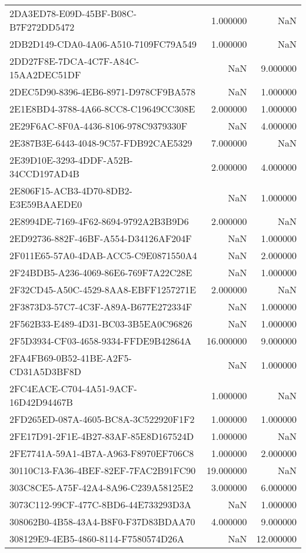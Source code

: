 \begin{tabular}{lrr}
2DA3ED78-E09D-45BF-B08C-B7F272DD5472 & 1.000000 & NaN \\
2DB2D149-CDA0-4A06-A510-7109FC79A549 & 1.000000 & NaN \\
2DD27F8E-7DCA-4C7F-A84C-15AA2DEC51DF & NaN & 9.000000 \\
2DEC5D90-8396-4EB6-8971-D978CF9BA578 & NaN & 1.000000 \\
2E1E8BD4-3788-4A66-8CC8-C19649CC308E & 2.000000 & 1.000000 \\
2E29F6AC-8F0A-4436-8106-978C9379330F & NaN & 4.000000 \\
2E387B3E-6443-4048-9C57-FDB92CAE5329 & 7.000000 & NaN \\
2E39D10E-3293-4DDF-A52B-34CCD197AD4B & 2.000000 & 4.000000 \\
2E806F15-ACB3-4D70-8DB2-E3E59BAAEDE0 & NaN & 1.000000 \\
2E8994DE-7169-4F62-8694-9792A2B3B9D6 & 2.000000 & NaN \\
2ED92736-882F-46BF-A554-D34126AF204F & NaN & 1.000000 \\
2F011E65-57A0-4DAB-ACC5-C9E0871550A4 & NaN & 2.000000 \\
2F24BDB5-A236-4069-86E6-769F7A22C28E & NaN & 1.000000 \\
2F32CD45-A50C-4529-8AA8-EBFF1257271E & 2.000000 & NaN \\
2F3873D3-57C7-4C3F-A89A-B677E272334F & NaN & 1.000000 \\
2F562B33-E489-4D31-BC03-3B5EA0C96826 & NaN & 1.000000 \\
2F5D3934-CF03-4658-9334-FFDE9B42864A & 16.000000 & 9.000000 \\
2FA4FB69-0B52-41BE-A2F5-CD31A5D3BF8D & NaN & 1.000000 \\
2FC4EACE-C704-4A51-9ACF-16D42D94467B & 1.000000 & NaN \\
2FD265ED-087A-4605-BC8A-3C522920F1F2 & 1.000000 & 1.000000 \\
2FE17D91-2F1E-4B27-83AF-85E8D167524D & 1.000000 & NaN \\
2FE7741A-59A1-4B7A-A963-F8970EF706C8 & 1.000000 & 2.000000 \\
30110C13-FA36-4BEF-82EF-7FAC2B91FC90 & 19.000000 & NaN \\
303C8CE5-A75F-42A4-8A96-C239A58125E2 & 3.000000 & 6.000000 \\
3073C112-99CF-477C-8BD6-44E733293D3A & NaN & 1.000000 \\
308062B0-4B58-43A4-B8F0-F37D83BDAA70 & 4.000000 & 9.000000 \\
308129E9-4EB5-4860-8114-F7580574D26A & NaN & 12.000000 \\

\end{tabular}
